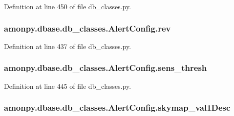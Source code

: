 Definition at line 450 of file db\-\_\-classes.\-py.

\hypertarget{classamonpy_1_1dbase_1_1db__classes_1_1_alert_config_a73ac175f4751ace5efefa98ccbfc0785}{
\subsubsection[{rev}]{\setlength{\rightskip}{0pt plus 5cm}amonpy.\-dbase.\-db\-\_\-classes.\-Alert\-Config.\-rev}}\label{classamonpy_1_1dbase_1_1db__classes_1_1_alert_config_a73ac175f4751ace5efefa98ccbfc0785}


Definition at line 437 of file db\-\_\-classes.\-py.

\hypertarget{classamonpy_1_1dbase_1_1db__classes_1_1_alert_config_acfdfd05a7551c6ee13a4c04970a5b496}{
\subsubsection[{sens\-\_\-thresh}]{\setlength{\rightskip}{0pt plus 5cm}amonpy.\-dbase.\-db\-\_\-classes.\-Alert\-Config.\-sens\-\_\-thresh}}\label{classamonpy_1_1dbase_1_1db__classes_1_1_alert_config_acfdfd05a7551c6ee13a4c04970a5b496}


Definition at line 445 of file db\-\_\-classes.\-py.

\hypertarget{classamonpy_1_1dbase_1_1db__classes_1_1_alert_config_a73eaa3edce9df7437c2f385e5ffcdc27}{
\subsubsection[{skymap\-\_\-val1\-Desc}]{\setlength{\rightskip}{0pt plus 5cm}amonpy.\-dbase.\-db\-\_\-classes.\-Alert\-Config.\-skymap\-\_\-val1\-Desc}}\label{classamonpy_1_1dbase_1_1db__classes_1_1_alert_config_a73eaa3edce9df7437c2f385e5ffcdc27}


